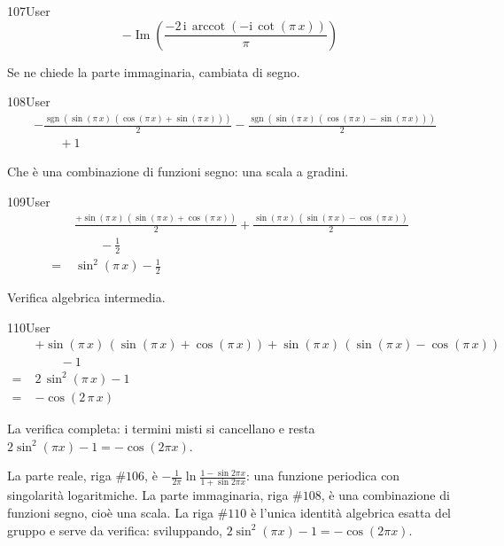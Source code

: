 \begin{espr}{107}{User}{}
\[
-\operatorname{Im}\!\left(\frac{-2\, \mathrm{i}\, \operatorname{arccot}\!\left(-\mathrm{i}\, \cot\!\left(\pi\, x\right)\right)}{\pi}\right)
\]
\end{espr}
Se ne chiede la parte immaginaria, cambiata di segno.

\begin{espr}{108}{User}{}
\begin{align*}
& -\frac{\operatorname{sgn}\!\left(\sin\!\left(\pi\, x\right)\, \left(\cos\!\left(\pi\, x\right) + \sin\!\left(\pi\, x\right)\right)\right)}{2} - \frac{\operatorname{sgn}\!\left(\sin\!\left(\pi\, x\right)\, \left(\cos\!\left(\pi\, x\right) - \sin\!\left(\pi\, x\right)\right)\right)}{2} \\
&\qquad + 1
\end{align*}
\end{espr}
Che è una combinazione di funzioni segno: una scala a gradini.

\begin{espr}{109}{User}{\verificata}
\begin{align*}
& \frac{+\sin\!\left(\pi\, x\right)\, \left(\sin\!\left(\pi\, x\right) + \cos\!\left(\pi\, x\right)\right)}{2} + \frac{\sin\!\left(\pi\, x\right)\, \left(\sin\!\left(\pi\, x\right) - \cos\!\left(\pi\, x\right)\right)}{2} \\
&\qquad - \frac{1}{2} \\
=\;& \sin^{2}\!\left(\pi\, x\right) - \frac{1}{2}
\end{align*}
\end{espr}
Verifica algebrica intermedia.

\begin{espr}{110}{User}{\verificata}
\begin{align*}
& +\sin\!\left(\pi\, x\right)\, \left(\sin\!\left(\pi\, x\right) + \cos\!\left(\pi\, x\right)\right) + \sin\!\left(\pi\, x\right)\, \left(\sin\!\left(\pi\, x\right) - \cos\!\left(\pi\, x\right)\right) \\
&\qquad - 1 \\
=\;& 2\, \sin^{2}\!\left(\pi\, x\right) - 1 \\
=\;& -\cos\!\left(2\, \pi\, x\right)
\end{align*}
\end{espr}
La verifica completa: i termini misti si cancellano e resta $2\sin^2(\pi x)-1=-\cos(2\pi x)$.


La parte reale, riga $\#106$, è $-\frac{1}{2\pi}\ln\frac{1-\sin2\pi x}{1+\sin2\pi x}$: una funzione periodica con singolarità logaritmiche. La parte immaginaria, riga $\#108$, è una combinazione di funzioni segno, cioè una scala. La riga $\#110$ è l'unica identità algebrica esatta del gruppo e serve da verifica: sviluppando, $2\sin^2(\pi x)-1=-\cos(2\pi x)$.

